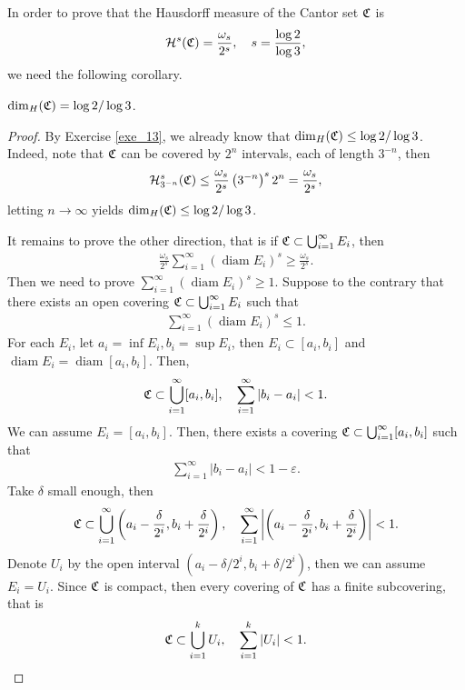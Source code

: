In order to prove that the Hausdorff measure of the Cantor set $\mathfrak{C}$ is 
\begin{align*}
    {\mathcal H}^s(\mathfrak{C}) = \frac{\omega_s}{2^s}, \quad s = \frac{\log 2}{\log 3},
\end{align*}
we need the following corollary.

\medskip

\begin{corollary}
$\dim_{H}(\mathfrak{C}) = \log 2 / \log 3$.
\end{corollary}
\begin{proof}
By Exercise \ref{exe_13}, we already know that $\dim_{H}(\mathfrak{C}) \leq \log 2 / \log 3$.  Indeed, note that $\mathfrak{C}$ can be covered by $2^n$ intervals, each of length $3^{-n}$, then
\begin{align*}
    {\mathcal H}^s_{3^{-n}}(\mathfrak{C}) \leq \frac{\omega_s}{2^s} \left(3^{-n}\right)^s 2^n = \frac{\omega_s}{2^s},
\end{align*}
letting $n\to\infty$ yields $\dim_{H}(\mathfrak{C}) \leq \log 2 / \log 3$.

It remains to prove the other direction, that is if $\mathfrak{C} \subset \bigcup^\infty_{i=1} E_i$, then 
\begin{align*}
    \frac{\omega_s}{2^s} \sum^\infty_{i=1} (\operatorname{diam} E_i)^s \geq \frac{\omega_s}{2^s}.
\end{align*}
Then we need to prove $\sum^\infty_{i=1} (\operatorname{diam} E_i)^s \geq 1$. Suppose to the contrary that there exists an open covering $\mathfrak{C} \subset \bigcup^\infty_{i=1} E_i$ such that 
\begin{align*}
    \sum^\infty_{i=1} (\operatorname{diam} E_i)^s \leq 1.
\end{align*}
For each $E_i$, let $a_i = \inf E_i, b_i = \sup E_i$, then $E_i \subset [a_i,b_i]$ and $\operatorname{diam} E_i = \operatorname{diam} [a_i,b_i]$. Then, 
\begin{align*}
    \mathfrak{C} \subset \bigcup^\infty_{i=1} [a_i,b_i], \quad \sum^\infty_{i=1} \left|b_i - a_i\right| < 1.
\end{align*}
We can assume $E_i = [a_i,b_i]$. Then, there exists a covering $\mathfrak{C} \subset \bigcup^\infty_{i=1} [a_i,b_i]$ such that 
\begin{align*}
    \sum^\infty_{i=1} \left|b_i - a_i\right| < 1 - \varepsilon.
\end{align*}
Take $\delta$ small enough, then 
\begin{align*}
    \mathfrak{C} \subset \bigcup^\infty_{i=1} \left(a_i-\frac{\delta}{2^i},b_i+\frac{\delta}{2^i}\right), \quad \sum^\infty_{i=1} \left|\left(a_i-\frac{\delta}{2^i},b_i+\frac{\delta}{2^i}\right)\right| < 1.
\end{align*}
Denote $U_i$ by the open interval $\left(a_i-\delta/2^i,b_i+\delta/2^i\right)$, then we can assume $E_i = U_i$. Since $\mathfrak{C}$ is compact, then every covering of $\mathfrak{C}$ has a finite subcovering, that is
\begin{align*}
    \mathfrak{C} \subset \bigcup^k_{i=1} U_i, \quad \sum^k_{i=1} \left|U_i\right| < 1.
\end{align*}


\end{proof}
